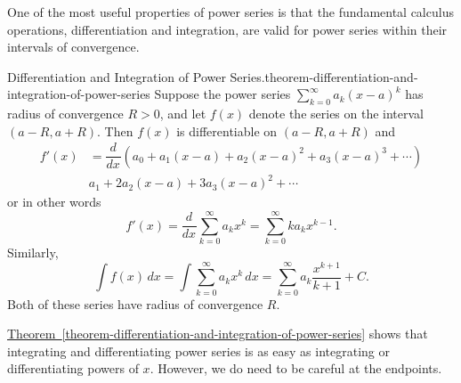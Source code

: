 \documentclass[10pt,]{book}
\numberwithin{equation}{section}
\newcommand{\dv}[3][]{\dfrac{d^{#1} #2}{d #3^{#1}}}
\newcommand{\gt}{>}
\newcommand{\amp}{&}
\begin{document}
\hypertarget{p-954}{}%
One of the most useful properties of power series is that the fundamental calculus operations, differentiation and integration, are valid for power series within their intervals of convergence.%
\begin{theorem}{Differentiation and Integration of Power Series.}{}{theorem-differentiation-and-integration-of-power-series}%
\hypertarget{p-955}{}%
Suppose the power series \(\sum_{k = 0}^{\infty}a_{k}(x - a)^{k}\) has radius of convergence \(R \gt 0\), and let \(f(x)\) denote the series on the interval \((a - R, a + R)\). Then \(f(x)\) is differentiable on \((a - R, a + R)\) and%
\begin{align*}
f'(x) \amp = \dv{}{x}\left(a_{0} + a_{1}(x - a) + a_{2}(x - a)^{2} + a_{3}(x - a)^{3} + \cdots\right)\\
\amp a_{1} + 2a_{2}(x - a) + 3a_{3}(x - a)^{2} + \cdots 
\end{align*}
or in other words%
\begin{equation*}
f'(x) = \dv{}{x}\sum_{k=0}^{\infty}a_{k}x^{k} = \sum_{k=0}^{\infty} ka_{k}x^{k-1}\text{.}
\end{equation*}
Similarly,%
\begin{equation*}
\int f(x)\,dx = \int \sum_{k = 0}^{\infty}a_{k}x^{k}\,dx = \sum_{k = 0}^{\infty} a_{k}\frac{x^{k + 1}}{k + 1} + C\text{.}
\end{equation*}
Both of these series have radius of convergence \(R\).%
\end{theorem}
\hypertarget{p-956}{}%
\hyperref[theorem-differentiation-and-integration-of-power-series]{Theorem~\ref{theorem-differentiation-and-integration-of-power-series}} shows that integrating and differentiating power series is as easy as integrating or differentiating powers of \(x\). However, we do need to be careful at the endpoints.%
\end{document}
